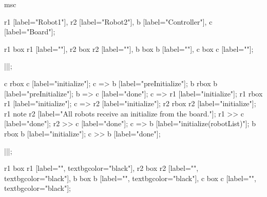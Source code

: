 \begin{msc}
msc
{

r1 [label="Robot1"],
r2 [label="Robot2"],
b [label="Controller"],
c [label="Board"];

r1 box r1 [label=""],
r2 box r2 [label=""],
b box b [label=""],
c box c [label=""];

|||;

c rbox c [label="initialize"];
c => b [label="preInitialize"];
b rbox b [label="preInitialize"];
b => c [label="done"];
c => r1 [label="initialize"];
r1 rbox r1 [label="initialize"];
c => r2 [label="initialize"];
r2 rbox r2 [label="initialize"];
r1 note r2 [label="All robots receive an initialize from the board."];
r1 >> c [label="done"];
r2 >> c [label="done"];
c => b [label="initialize(robotList)"];
b rbox b [label="initialize"];
c >> b [label="done"];

|||;

r1 box r1 [label="", textbgcolor="black"],
r2 box r2 [label="", textbgcolor="black"],
b box b [label="", textbgcolor="black"],
c box c [label="", textbgcolor="black"];

}
\end{msc}
